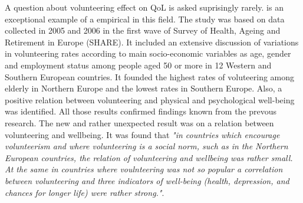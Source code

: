 \documentclass[10pt, letterpaper]{article}
\begin{document}
\begin{spacing}{1.4}
A question about volunteering effect on QoL is asked suprisingly  rarely. \citet{haski09} is an exceptional example of a empirical in this field. The study was based on data collected in 2005 and 2006 in the first wave of Survey of Health, Ageing and Retirement in Europe (SHARE). It included an extensive discussion of variations in volunteering rates according to main socio-economic variables as age, gender and employment status among people aged 50 or more in 12 Western and Southern European countries. It founded  the highest rates of voluteering among elderly in Northern Europe and the lowest rates in Southern Europe. Also, a positive relation between volunteering and physical and psychological well-being was identified. All those results confirmed findings known from the prevous research. The new and rather unexpected result was on a relation between volunteering and wellbeing. It was found that \textit{"in countries which encourage volunteerism and where volunteering is a social norm, such as in the Northern European countries, the relation of volunteering and wellbeing was rather small. At the same in countries where voulnteering was not so popular  a correlation between volunteering and three indicators of well-being (health, depression, and chances for longer life) were rather strong."}.  \\


\end{spacing}
\end{document}
